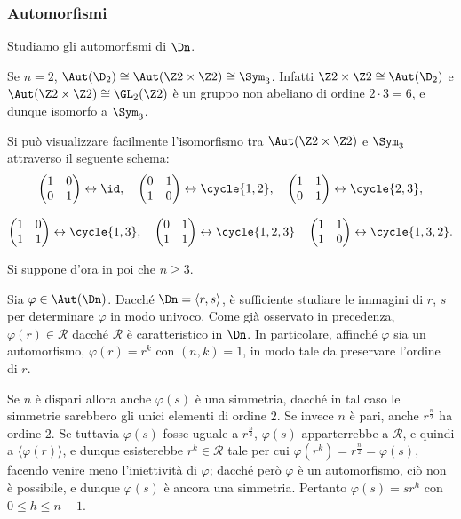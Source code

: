 \documentclass[11pt]{scrartcl}
\begin{document}
	\subsubsection{Automorfismi}
	
	Studiamo gli automorfismi di $\Dn$. \medskip
	
	
	Se $n = 2$, $\Aut(\D_2) \cong \Aut(\Z2 \times \Z2) \cong \Sym_3$. Infatti
	$\Z2 \times \Z2 \cong \Aut(\D_2)$ e $\Aut(\Z2 \times \Z2) \cong \GL_2(\Z2)$ è
	un gruppo non abeliano di ordine $2 \cdot 3 = 6$, e dunque isomorfo a $\Sym_3$. \medskip

	Si può visualizzare facilmente l'isomorfismo
	tra $\Aut(\Z2 \times \Z2)$ e $\Sym_3$ attraverso il seguente schema:
	\[
	\begin{pmatrix}1 & 0 \\ 0 & 1\end{pmatrix} \leftrightarrow \id, \quad
	\begin{pmatrix}0 & 1 \\ 1 & 0\end{pmatrix} \leftrightarrow \cycle{1, 2}, \quad
	\begin{pmatrix}1 & 1 \\ 0 & 1\end{pmatrix} \leftrightarrow \cycle{2, 3},
	\]
	
	\[
	\begin{pmatrix}1 & 0 \\ 1 & 1\end{pmatrix} \leftrightarrow \cycle{1, 3}, \quad
	\begin{pmatrix}0 & 1 \\ 1 & 1\end{pmatrix} \leftrightarrow \cycle{1, 2, 3} \quad
	\begin{pmatrix}1 & 1 \\ 1 & 0\end{pmatrix} \leftrightarrow \cycle{1, 3, 2}.
	\] \medskip
	
	Si suppone d'ora in poi che $n \geq 3$. \medskip
 
	Sia $\varphi \in \Aut(\Dn)$. Dacché $\Dn = \langle
	r, s\rangle$, è sufficiente studiare le immagini di $r$, $s$ per determinare
	$\varphi$ in modo univoco. Come già osservato in precedenza, $\varphi(r) \in \mathcal{R}$
	dacché $\mathcal{R}$ è caratteristico in $\Dn$. In particolare, affinché $\varphi$ sia
	un automorfismo, $\varphi(r) = r^k$ con $(n, k) = 1$, in modo tale da preservare l'ordine
	di $r$. \medskip
	
	
	Se $n$ è dispari allora anche $\varphi(s)$ è una simmetria, dacché in tal
	caso le simmetrie sarebbero gli unici elementi di ordine $2$. Se invece $n$ è pari,
	anche $r^{\frac{n}{2}}$ ha ordine $2$. Se tuttavia $\varphi(s)$ fosse uguale
	a $r^{\frac{n}{2}}$, $\varphi(s)$ apparterrebbe a $\mathcal{R}$, e quindi
	a $\langle \varphi(r) \rangle$, e dunque esisterebbe $r^k \in \mathcal{R}$ tale per
	cui $\varphi(r^k) = r^{\frac{n}{2}} = \varphi(s)$, facendo venire meno l'iniettività
	di $\varphi$;
	dacché però $\varphi$ è un automorfismo, ciò non è possibile, e dunque
	$\varphi(s)$ è ancora una simmetria. Pertanto $\varphi(s) = sr^h$ con
	$0 \leq h \leq n-1$. \medskip
\end{document}
